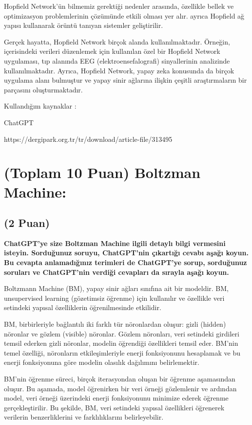 \documentclass[11pt]{article}
\begin{document}
Hopfield Network'ün bilmemiz gerektiği nedenler arasında,  özellikle bellek ve optimizasyon problemlerinin çözümünde etkili olması yer alır. ayrıca Hopfield ağ yapısı kullanarak örüntü tanıyan sistemler geliştirilir.

Gerçek hayatta, Hopfield Network birçok alanda kullanılmaktadır. Örneğin, içerisindeki verileri düzenlemek için kullanılan özel bir Hopfield Network uygulaması, tıp alanında EEG (elektroensefalografi) sinyallerinin analizinde kullanılmaktadır.
Ayrıca, Hopfield Network, yapay zeka konusunda da birçok uygulama alanı bulmuştur ve yapay sinir ağlarına ilişkin çeşitli araştırmaların bir parçasını oluşturmaktadır.

Kullandığım kaynaklar : 

ChatGPT

https://dergipark.org.tr/tr/download/article-file/313495

\section{(Toplam 10 Puan) Boltzman Machine:}

\subsection{(2 Puan)} \textbf{ChatGPT’ye size Boltzman Machine ilgili detaylı bilgi vermesini isteyin. Sorduğunuz soruyu, ChatGPT'nin çıkartığı cevabı aşağı koyun. Bu cevapta anlamadığınız terimleri de ChatGPT’ye sorup, sorduğunuz soruları ve ChatGPT’nin verdiği cevapları da sırayla aşağı koyun.}

Boltzmann Machine (BM), yapay sinir ağları sınıfına ait bir modeldir. BM, unsupervised learning (gözetimsiz öğrenme) için kullanılır ve özellikle veri setindeki yapısal özelliklerin öğrenilmesinde etkilidir.

BM, birbirleriyle bağlantılı iki farklı tür nöronlardan oluşur: gizli (hidden) nöronlar ve gözlem (visible) nöronlar. Gözlem nöronları, veri setindeki girdileri temsil ederken gizli nöronlar, modelin öğrendiği özellikleri temsil eder. BM'nin temel özelliği, nöronların etkileşimleriyle enerji fonksiyonunu hesaplamak ve bu enerji fonksiyonuna göre modelin olasılık dağılımını belirlemektir.

BM'nin öğrenme süreci, birçok iterasyondan oluşan bir öğrenme aşamasından oluşur. Bu aşamada, model öğrenirken bir veri örneği gözlemlenir ve ardından model, veri örneği üzerindeki enerji fonksiyonunu minimize ederek öğrenme gerçekleştirilir. Bu şekilde, BM, veri setindeki yapısal özellikleri öğrenerek verilerin benzerliklerini ve farklılıklarını belirleyebilir.
\end{document}
